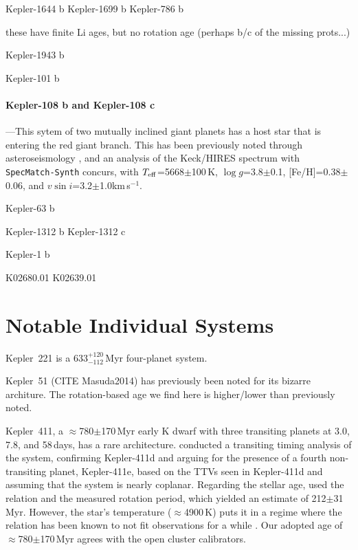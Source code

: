 \documentclass[11pt,twocolumn,tighten]{aastex63}
\newcommand{\kms}{{km\,s$^{-1}$}}
\begin{document}
Kepler-1644 b
Kepler-1699 b
 Kepler-786 b

these have finite Li ages, but no rotation age (perhaps b/c of the missing prots...)

Kepler-1943 b

 Kepler-101 b

\paragraph{Kepler-108 b and Kepler-108 c}---This sytem of two mutually
inclined giant planets \citep{2017AJ....153...45M} has a host star
that is entering the red giant branch.  This has been previously noted
through asteroseismology \citep{2013ApJ...767..127H}, and an analysis
of the Keck/HIRES spectrum with \texttt{SpecMatch-Synth} concurs, with
$T_{\rm eff}$=5668$\pm$100\,K, $\log g$=3.8$\pm$0.1,
[Fe/H]=0.38$\pm$0.06, and $v\sin i$=3.2$\pm$1.0\kms.



  Kepler-63 b

Kepler-1312 b Kepler-1312 c

   Kepler-1 b

K02680.01
K02639.01



\section{Notable Individual Systems}

Kepler~221 is a 633$^{+120}_{-112}$\,Myr four-planet system.

Kepler~51 (CITE Masuda2014) has previously been noted for its bizarre architure.
The rotation-based age we find here is higher/lower than previously noted.

Kepler~411, a $\approx$780$\pm$170\,Myr early K dwarf with three
transiting planets at 3.0, 7.8, and 58\,days, has a rare
architecture.  \citet{2019A&A...624A..15S} conducted a transiting
timing analysis of the system, confirming Kepler-411d and arguing for
the presence of a fourth non-transiting planet, Kepler-411e, based on
the TTVs seen in Kepler-411d and assuming that the system is nearly
coplanar.  Regarding the stellar age, \citet{2019A&A...624A..15S} used
the \citet{2007ApJ...669.1167B} relation and the measured rotation
period, which yielded an estimate of 212$\pm$31\,Myr.  However, the
star's temperature ($\approx$4900\,K) puts it in a regime where the
\citeauthor{2007ApJ...669.1167B} relation has been known to not fit
observations for a while
\citep[e.g.][Fig.~9]{Mamajek_2008}.  Our adopted age of
$\approx$780$\pm$170\,Myr agrees with the open cluster calibrators.
\end{document}
